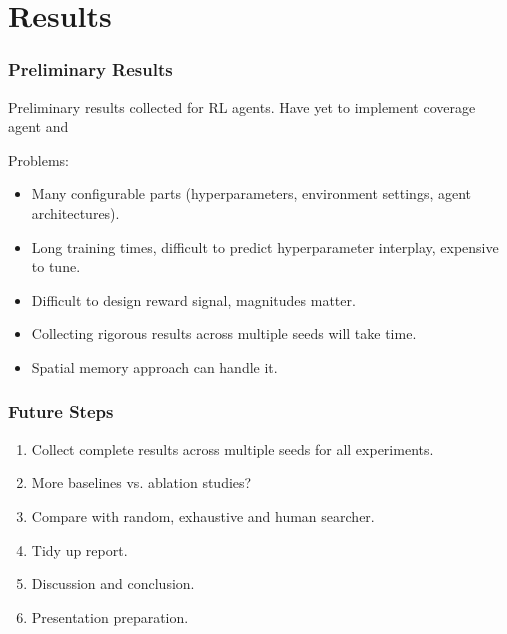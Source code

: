\section{Results}

\begin{frame}
    \frametitle{Preliminary Results}

    Preliminary results collected for RL agents.
    Have yet to implement coverage agent and 

    Problems:

    \begin{itemize}
        \item Many configurable parts (hyperparameters, environment settings, agent architectures).
        \item Long training times, difficult to predict hyperparameter interplay, expensive to tune.
        \item Difficult to design reward signal, magnitudes matter.
        \item Collecting rigorous results across multiple seeds will take time.
        \item Spatial memory approach can handle it.
    \end{itemize}
\end{frame}

\begin{frame}
    \frametitle{Future Steps}

    \begin{enumerate}
        \item Collect complete results across multiple seeds for all experiments.
        \item More baselines vs. ablation studies?
        \item Compare with random, exhaustive and human searcher.
        \item Tidy up report.
        \item Discussion and conclusion.
        \item Presentation preparation.
    \end{enumerate}
\end{frame}
